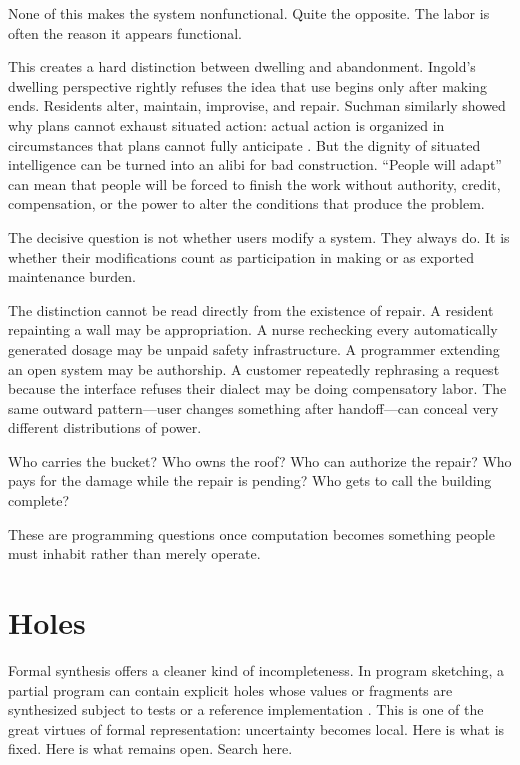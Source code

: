 \documentclass[11pt]{article}
\begin{document}
None of this makes the system nonfunctional. Quite the opposite. The labor is often the reason it appears functional.

This creates a hard distinction between dwelling and abandonment. Ingold's dwelling perspective rightly refuses the idea that use begins only after making ends. Residents alter, maintain, improvise, and repair. Suchman similarly showed why plans cannot exhaust situated action: actual action is organized in circumstances that plans cannot fully anticipate \cite{suchman1987}. But the dignity of situated intelligence can be turned into an alibi for bad construction. ``People will adapt'' can mean that people will be forced to finish the work without authority, credit, compensation, or the power to alter the conditions that produce the problem.

The decisive question is not whether users modify a system. They always do. It is whether their modifications count as participation in making or as exported maintenance burden.

The distinction cannot be read directly from the existence of repair. A resident repainting a wall may be appropriation. A nurse rechecking every automatically generated dosage may be unpaid safety infrastructure. A programmer extending an open system may be authorship. A customer repeatedly rephrasing a request because the interface refuses their dialect may be doing compensatory labor. The same outward pattern---user changes something after handoff---can conceal very different distributions of power.

Who carries the bucket? Who owns the roof? Who can authorize the repair? Who pays for the damage while the repair is pending? Who gets to call the building complete?

These are programming questions once computation becomes something people must inhabit rather than merely operate.

\section*{Holes}

Formal synthesis offers a cleaner kind of incompleteness. In program sketching, a partial program can contain explicit holes whose values or fragments are synthesized subject to tests or a reference implementation \cite{solarlezama2009}. This is one of the great virtues of formal representation: uncertainty becomes local. Here is what is fixed. Here is what remains open. Search here.
\end{document}
